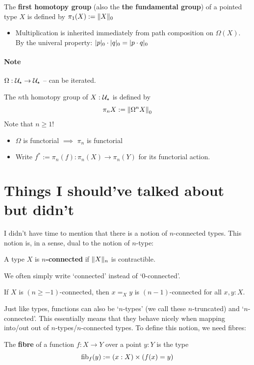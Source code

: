 \documentclass[10pt,oneside,leqno,openright]{memoir}
\begin{document}
\begin{definition}
  The \textbf{first homotopy group} (also the \textbf{the fundamental group}) of a pointed type $X$ is defined by $\pi_1(X):= \lVert X\rVert_0$
  \begin{itemize}
    \item Multiplication is inherited immediately from path composition on $\Omega(X)$. By the univeral property: $\lvert p\rvert_0 \cdot \lvert q\rvert_0 = \lvert p \cdot q\rvert_0$
  \end{itemize}
\end{definition}

\paragraph{Note} $\Omega : \mathcal{U}_\star \to \mathcal{U}_\star$ -- can be iterated.

\begin{definition}
    The $n$th homotopy group of $X:\mathcal{U}_\star$ is defined by
    \[ \pi_n X := {\lVert\Omega^n X\rVert}_0\]
    Note that $n \geq 1$!
\end{definition}
\begin{itemize}
\item $\Omega$ is functorial $\implies$ $\pi_n$ is functorial
\item Write $f^* := \pi_n(f) : \pi_n(X) \to \pi_n(Y)$ for its functorial action.
\end{itemize}




\section*{Things I should've talked about but didn't}
I didn't have time to mention that there is a notion of $n$-connected types. This notion is, in a sense, dual to the notion of $n$-type:
\begin{definition}
    A type $X$ is \textbf{$n$-connected} if $\lVert X\rVert_n$ is contractible.
\end{definition}
We often simply write `connected' instead of `$0$-connected'.
\begin{proposition}
  If $X$ is $(n \geq -1)$-connected, then $x=_{X}y$ is $(n-1)$-connected for all $x,y:X$.
\end{proposition}

Just like types, functions can also be `$n$-types' (we call these $n$-truncated) and `$n$-connected'. This essentially means that they behave nicely when mapping into/out out of $n$-types/$n$-connected types. To define this notion, we need fibres: 
\begin{definition}
  The \textbf{fibre} of a function $f:X\to Y$ over a point $y : Y$ is the type
  \[ \operatorname{fib}_f(y) := (x : X) \times (f(x) = y) \]
\end{definition}
\end{document}
